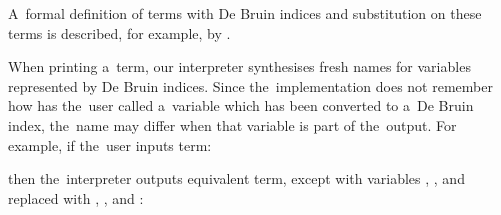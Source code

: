 A~formal definition of terms with De Bruin indices and substitution on these
terms is described, for example, by \citet[Chapter~6]{pierce_2002}.

When printing a~term, our interpreter synthesises fresh names for variables
represented by De Bruin indices. Since the~implementation does not remember how
has the~user called a~variable which has been converted to a~De Bruin index,
the~name may differ when that variable is part of the~output. For example, if
the~user inputs term:
\begin{center}
\end{center}
then the~interpreter outputs equivalent term, except with variables
, , and  replaced with
, , and :

\begin{center}
\end{center}

